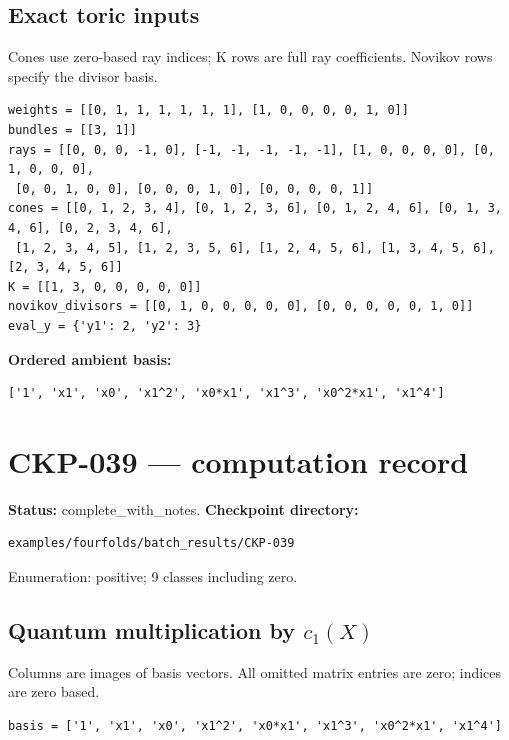 \documentclass[10pt,a4paper]{article}
\begin{document}
\subsection*{Exact toric inputs}
Cones use zero-based ray indices; K rows are full ray coefficients. Novikov rows specify the divisor basis.

\begin{lstlisting}
weights = [[0, 1, 1, 1, 1, 1, 1], [1, 0, 0, 0, 0, 1, 0]]
bundles = [[3, 1]]
rays = [[0, 0, 0, -1, 0], [-1, -1, -1, -1, -1], [1, 0, 0, 0, 0], [0, 1, 0, 0, 0],
 [0, 0, 1, 0, 0], [0, 0, 0, 1, 0], [0, 0, 0, 0, 1]]
cones = [[0, 1, 2, 3, 4], [0, 1, 2, 3, 6], [0, 1, 2, 4, 6], [0, 1, 3, 4, 6], [0, 2, 3, 4, 6],
 [1, 2, 3, 4, 5], [1, 2, 3, 5, 6], [1, 2, 4, 5, 6], [1, 3, 4, 5, 6], [2, 3, 4, 5, 6]]
K = [[1, 3, 0, 0, 0, 0, 0]]
novikov_divisors = [[0, 1, 0, 0, 0, 0, 0], [0, 0, 0, 0, 0, 1, 0]]
eval_y = {'y1': 2, 'y2': 3}
\end{lstlisting}

\textbf{Ordered ambient basis:}
\begin{lstlisting}
['1', 'x1', 'x0', 'x1^2', 'x0*x1', 'x1^3', 'x0^2*x1', 'x1^4']
\end{lstlisting}

\clearpage\section*{CKP-039 --- computation record}
\textbf{Status:} complete\_with\_notes.
\textbf{Checkpoint directory:}
\begin{lstlisting}
examples/fourfolds/batch_results/CKP-039
\end{lstlisting}

Enumeration: positive; 9 classes including zero.
\subsection*{Quantum multiplication by $c_1(X)$}
Columns are images of basis vectors. All omitted matrix entries are zero; indices are zero based.

\begin{lstlisting}
basis = ['1', 'x1', 'x0', 'x1^2', 'x0*x1', 'x1^3', 'x0^2*x1', 'x1^4']
\end{lstlisting}
\end{document}
